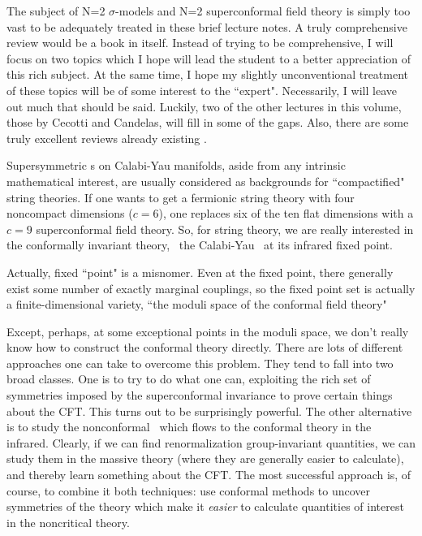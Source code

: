 The subject of N=2 $\sigma$-models and N=2 superconformal field theory is
simply too vast to be adequately treated in these brief lecture notes. A truly
comprehensive review would be a book in itself. Instead of trying to be
comprehensive, I will focus on two topics which I hope will lead the student
to a better appreciation of this rich subject. At the same time, I hope my
slightly unconventional treatment of these topics will be of some interest to
the ``expert". Necessarily, I will leave out much that should be  said.
Luckily, two of the other lectures in this volume, those by Cecotti and
Candelas, will fill in some of the gaps. Also, there are some truly excellent
reviews already existing .

Supersymmetric \sm s on Calabi-Yau manifolds, aside from any intrinsic
mathematical interest, are usually considered as  backgrounds for
``compactified" string theories. If one wants to get a fermionic string
theory with four noncompact dimensions ($c=6$), one replaces six of the ten
flat dimensions with a $c=9$ superconformal field theory. So, for string
theory, we are really interested in the conformally invariant theory, \ie\ the
 Calabi-Yau \sm\ at its infrared fixed point.

Actually, fixed ``point" is a misnomer. Even at the fixed point, there
generally exist some number of exactly marginal couplings, so the fixed point
set is actually a finite-dimensional variety, ``the moduli space of the
conformal field theory"

 Except, perhaps, at
some exceptional points in the moduli space, we don't really know how to
construct the conformal theory directly. There are lots of different
approaches one can take to overcome this problem. They tend to fall into
two broad classes. One is to try to do what one can, exploiting the rich set
of symmetries imposed by the superconformal invariance to prove certain
things about the CFT. This turns out to be surprisingly powerful. The other
alternative is to study the nonconformal \sm\ which flows to the conformal
theory in the infrared. Clearly, if we can find renormalization
group-invariant quantities, we can study them in the massive theory (where
they are generally easier to calculate), and thereby learn something about the
CFT. The most successful approach is, of course, to combine {it both}
techniques: use conformal methods to uncover symmetries of the theory which
make it {\it easier} to calculate quantities of interest in the noncritical
theory.

